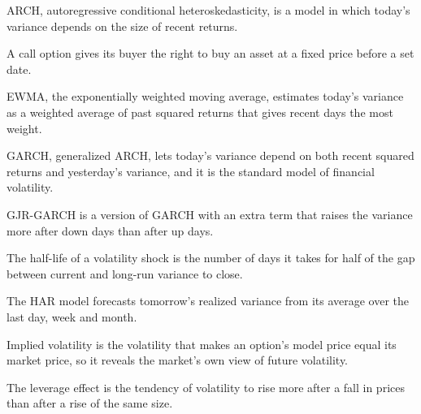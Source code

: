 \makeatletter
{}
\makeatother

\begin{keyterms}
\small
\begin{description}[leftmargin=0pt, itemsep=2pt, parsep=0pt, font=\normalfont\bfseries\color{FEMaroon}]
  \item[ARCH.] ARCH, autoregressive conditional heteroskedasticity, is a model in which today's variance depends on the size of recent returns.
  \item[Call option.] A call option gives its buyer the right to buy an asset at a fixed price before a set date.
  \item[EWMA.] EWMA, the exponentially weighted moving average, estimates today's variance as a weighted average of past squared returns that gives recent days the most weight.
  \item[GARCH.] GARCH, generalized ARCH, lets today's variance depend on both recent squared returns and yesterday's variance, and it is the standard model of financial volatility.
  \item[GJR-GARCH.] GJR-GARCH is a version of GARCH with an extra term that raises the variance more after down days than after up days.
  \item[Half-life.] The half-life of a volatility shock is the number of days it takes for half of the gap between current and long-run variance to close.
  \item[HAR model.] The HAR model forecasts tomorrow's realized variance from its average over the last day, week and month.
  \item[Implied volatility.] Implied volatility is the volatility that makes an option's model price equal its market price, so it reveals the market's own view of future volatility.
  \item[Leverage effect.] The leverage effect is the tendency of volatility to rise more after a fall in prices than after a rise of the same size.

\end{description}
\end{keyterms}
